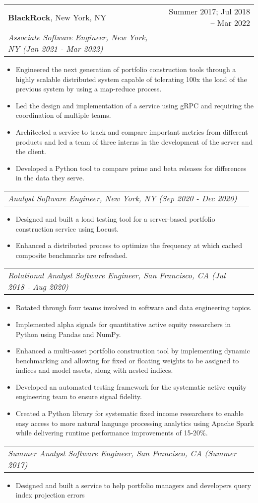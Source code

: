 \documentclass[letterpaper,10pt]{article}
\makeatletter
\newcommand{\resumeItem}[1]{
  \item\small{#1}
}
\newcommand{\resumeSubheading}[4]{
  \vspace{-1pt}\item
    \begin{tabular*}{0.97\textwidth}[t]{l@{\extracolsep{\fill}}r}
      \textbf{#1}, \small{#2} & \small{#3} \\
      \textit{\small #4} \\
    \end{tabular*}\vspace{-5pt}
}
\newcommand{\resumeSubSubheading}[1]{
    \begin{tabular*}{0.97\textwidth}{l@{\extracolsep{\fill}}r}
      \textit{\small#1}\\
    \end{tabular*}\vspace{-5pt}
}
\newcommand{\resumeItemListStart}{\begin{itemize}}
\newcommand{\resumeItemListEnd}{\end{itemize}\vspace{-5pt}}
\makeatother
\begin{document}
    \resumeSubheading
      {BlackRock}{New York, NY}{Summer 2017; Jul 2018 -- Mar 2022}
      {Associate Software Engineer, New York, NY (Jan 2021 - Mar 2022)}
      \resumeItemListStart
        \resumeItem{Engineered the next generation of portfolio construction tools through a highly scalable distributed system capable of tolerating 100x the load of the previous system by using a map-reduce process.}
        \resumeItem{Led the design and implementation of a service using gRPC and requiring the coordination of multiple teams.}
        \resumeItem{Architected a service to track and compare important metrics from different products and led a team of three interns in the development of the server and the client.}
        \resumeItem{Developed a Python tool to compare prime and beta releases for differences in the data they serve.}
      \resumeItemListEnd
      \resumeSubSubheading
      {Analyst Software Engineer, New York, NY (Sep 2020 - Dec 2020)}
      \resumeItemListStart
        \resumeItem{Designed and built a load testing tool for a server-based portfolio construction service using Locust.}
        \resumeItem{Enhanced a distributed process to optimize the frequency at which cached composite benchmarks are refreshed.}
      \resumeItemListEnd
      \resumeSubSubheading
      {Rotational Analyst Software Engineer, San Francisco, CA (Jul 2018 - Aug 2020)}
      \resumeItemListStart
        \resumeItem{Rotated through four teams involved in software and data engineering topics.}
        \resumeItem{Implemented alpha signals for quantitative active equity researchers in Python using Pandas and NumPy.}
        \resumeItem{Enhanced a multi-asset portfolio construction tool by implementing dynamic benchmarking and allowing for fixed or floating weights to be assigned to indices and model assets, along with nested indices.}
        \resumeItem{Developed an automated testing framework for the systematic active equity engineering team to ensure signal fidelity.}
        \resumeItem{Created a Python library for systematic fixed income researchers to enable easy access to more natural language processing analytics using Apache Spark while delivering runtime performance improvements of 15-20\%.}
      \resumeItemListEnd
      \resumeSubSubheading
      {Summer Analyst Software Engineer, San Francisco, CA (Summer 2017)}
      \resumeItemListStart
        \resumeItem{Designed and built a service to help portfolio managers and developers query index projection errors}
      \resumeItemListEnd
\end{document}
